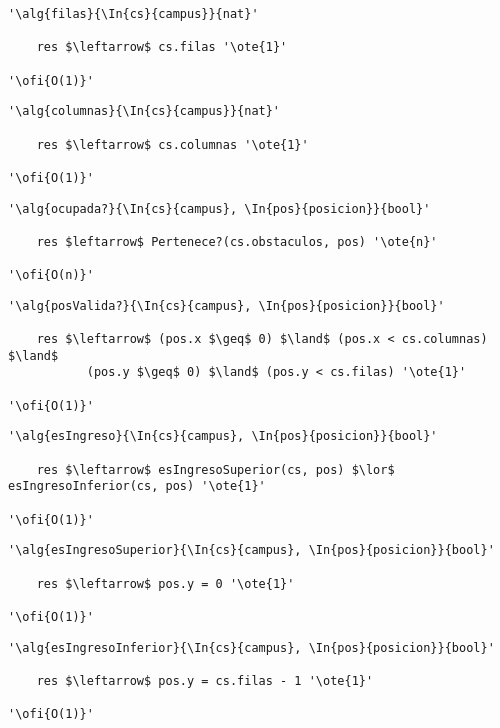 \begin{lstlisting}[mathescape]
'\alg{filas}{\In{cs}{campus}}{nat}'

	res $\leftarrow$ cs.filas '\ote{1}'

'\ofi{O(1)}'
\end{lstlisting}

\begin{lstlisting}[mathescape]
'\alg{columnas}{\In{cs}{campus}}{nat}'

	res $\leftarrow$ cs.columnas '\ote{1}'

'\ofi{O(1)}'
\end{lstlisting}

\begin{lstlisting}[mathescape]
'\alg{ocupada?}{\In{cs}{campus}, \In{pos}{posicion}}{bool}'

	res $leftarrow$ Pertenece?(cs.obstaculos, pos) '\ote{n}'

'\ofi{O(n)}'
\end{lstlisting}

\begin{lstlisting}[mathescape]
'\alg{posValida?}{\In{cs}{campus}, \In{pos}{posicion}}{bool}'

	res $\leftarrow$ (pos.x $\geq$ 0) $\land$ (pos.x < cs.columnas) $\land$ 
	       (pos.y $\geq$ 0) $\land$ (pos.y < cs.filas) '\ote{1}'

'\ofi{O(1)}'
\end{lstlisting}

\begin{lstlisting}[mathescape]
'\alg{esIngreso}{\In{cs}{campus}, \In{pos}{posicion}}{bool}'

	res $\leftarrow$ esIngresoSuperior(cs, pos) $\lor$ esIngresoInferior(cs, pos) '\ote{1}'

'\ofi{O(1)}'
\end{lstlisting}

\begin{lstlisting}[mathescape]
'\alg{esIngresoSuperior}{\In{cs}{campus}, \In{pos}{posicion}}{bool}'
	
	res $\leftarrow$ pos.y = 0 '\ote{1}'

'\ofi{O(1)}'
\end{lstlisting}

\begin{lstlisting}[mathescape]
'\alg{esIngresoInferior}{\In{cs}{campus}, \In{pos}{posicion}}{bool}'
	
	res $\leftarrow$ pos.y = cs.filas - 1 '\ote{1}'

'\ofi{O(1)}'
\end{lstlisting}


